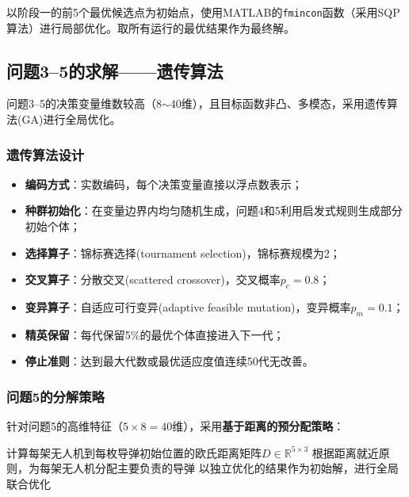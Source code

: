 以阶段一的前5个最优候选点为初始点，使用MATLAB的\texttt{fmincon}函数（采用SQP算法）进行局部优化。取所有运行的最优结果作为最终解。

\subsection{问题3--5的求解——遗传算法}

问题3--5的决策变量维数较高（8$\sim$40维），且目标函数非凸、多模态，采用遗传算法(GA)进行全局优化。

\subsubsection{遗传算法设计}

\begin{itemize}
    \item \textbf{编码方式}：实数编码，每个决策变量直接以浮点数表示；
    \item \textbf{种群初始化}：在变量边界内均匀随机生成，问题4和5利用启发式规则生成部分初始个体；
    \item \textbf{选择算子}：锦标赛选择(tournament selection)，锦标赛规模为2；
    \item \textbf{交叉算子}：分散交叉(scattered crossover)，交叉概率$p_c=0.8$；
    \item \textbf{变异算子}：自适应可行变异(adaptive feasible mutation)，变异概率$p_m=0.1$；
    \item \textbf{精英保留}：每代保留5\%的最优个体直接进入下一代；
    \item \textbf{停止准则}：达到最大代数或最优适应度值连续50代无改善。
\end{itemize}

\subsubsection{问题5的分解策略}

针对问题5的高维特征（$5 \times 8 = 40$维），采用\textbf{基于距离的预分配策略}：

\begin{algorithm}[H]
    \caption{问题5的UAV-导弹任务分配策略}
    \SetAlgoLined
    计算每架无人机到每枚导弹初始位置的欧氏距离矩阵$D \in \mathbb{R}^{5 \times 3}$\;
    根据距离就近原则，为每架无人机分配主要负责的导弹\;
    以独立优化的结果作为初始解，进行全局联合优化\;
\end{algorithm}

